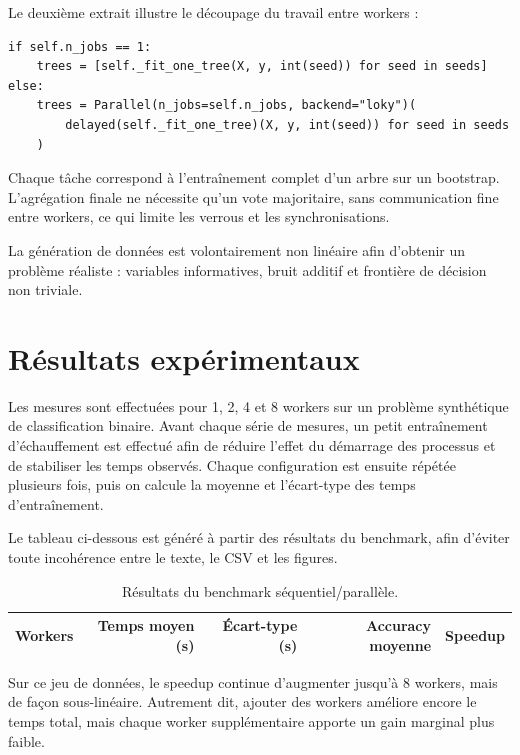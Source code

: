 \documentclass[11pt,a4paper]{article}
\begin{document}
Le deuxième extrait illustre le découpage du travail entre workers :

\begin{lstlisting}[style=pythonstyle]
if self.n_jobs == 1:
    trees = [self._fit_one_tree(X, y, int(seed)) for seed in seeds]
else:
    trees = Parallel(n_jobs=self.n_jobs, backend="loky")(
        delayed(self._fit_one_tree)(X, y, int(seed)) for seed in seeds
    )
\end{lstlisting}

Chaque tâche correspond à l'entraînement complet d'un arbre sur un bootstrap. L'agrégation finale ne nécessite qu'un vote majoritaire, sans communication fine entre workers, ce qui limite les verrous et les synchronisations.

La génération de données est volontairement non linéaire afin d'obtenir un problème réaliste : variables informatives, bruit additif et frontière de décision non triviale.

\section{Résultats expérimentaux}

Les mesures sont effectuées pour 1, 2, 4 et 8 workers sur un problème synthétique de classification binaire. Avant chaque série de mesures, un petit entraînement d'échauffement est effectué afin de réduire l'effet du démarrage des processus et de stabiliser les temps observés. Chaque configuration est ensuite répétée plusieurs fois, puis on calcule la moyenne et l'écart-type des temps d'entraînement.

Le tableau ci-dessous est généré à partir des résultats du benchmark, afin d'éviter toute incohérence entre le texte, le CSV et les figures.

\begin{table}[H]
\centering
\begin{tabular}{rrrrr}
\toprule
Workers & Temps moyen (s) & Écart-type (s) & Accuracy moyenne & Speedup \\
\midrule

\bottomrule
\end{tabular}
\caption{Résultats du benchmark séquentiel/parallèle.}
\end{table}

Sur ce jeu de données, le speedup continue d'augmenter jusqu'à 8 workers, mais de façon sous-linéaire. Autrement dit, ajouter des workers améliore encore le temps total, mais chaque worker supplémentaire apporte un gain marginal plus faible.
\end{document}
